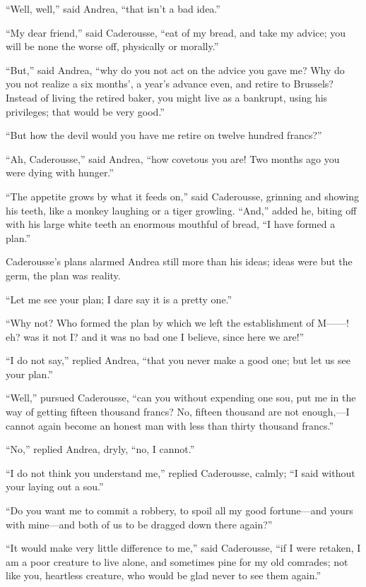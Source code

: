 “Well, well,” said Andrea, “that isn’t a bad idea.”

“My dear friend,” said Caderousse, “eat of my bread, and take my
advice; you will be none the worse off, physically or morally.”

“But,” said Andrea, “why do you not act on the advice you gave me? Why
do you not realize a six months’, a year’s advance even, and retire to
Brussels? Instead of living the retired baker, you might live as a
bankrupt, using his privileges; that would be very good.”

“But how the devil would you have me retire on twelve hundred francs?”

“Ah, Caderousse,” said Andrea, “how covetous you are! Two months ago
you were dying with hunger.”

“The appetite grows by what it feeds on,” said Caderousse, grinning and
showing his teeth, like a monkey laughing or a tiger growling. “And,”
added he, biting off with his large white teeth an enormous mouthful of
bread, “I have formed a plan.”

Caderousse’s plans alarmed Andrea still more than his ideas; ideas were
but the germ, the plan was reality.

“Let me see your plan; I dare say it is a pretty one.”

“Why not? Who formed the plan by which we left the establishment of
M——! eh? was it not I? and it was no bad one I believe, since here we
are!”

“I do not say,” replied Andrea, “that you never make a good one; but
let us see your plan.”

“Well,” pursued Caderousse, “can you without expending one sou, put me
in the way of getting fifteen thousand francs? No, fifteen thousand are
not enough,—I cannot again become an honest man with less than thirty
thousand francs.”

“No,” replied Andrea, dryly, “no, I cannot.”

“I do not think you understand me,” replied Caderousse, calmly; “I said
without your laying out a sou.”

“Do you want me to commit a robbery, to spoil all my good fortune—and
yours with mine—and both of us to be dragged down there again?”

“It would make very little difference to me,” said Caderousse, “if I
were retaken, I am a poor creature to live alone, and sometimes pine
for my old comrades; not like you, heartless creature, who would be
glad never to see them again.”

